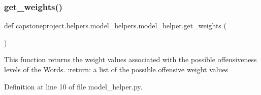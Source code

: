 \subsubsection{\texorpdfstring{get\+\_\+weights()}{get\_weights()}}
{\footnotesize\ttfamily def capstoneproject.\+helpers.\+model\+\_\+helpers.\+model\+\_\+helper.\+get\+\_\+weights (\begin{DoxyParamCaption}{ }\end{DoxyParamCaption})}

\begin{DoxyVerb}This function returns the weight values associated with the possible
offensiveness levels of the Words.
:return: a list of the possible offensive weight values
\end{DoxyVerb}
 

Definition at line 10 of file model\+\_\+helper.\+py.

